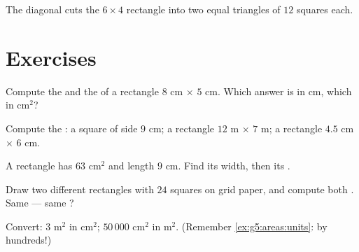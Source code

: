 \begin{omfigure}

{\small The diagonal cuts the $6 \times 4$ rectangle into two equal
triangles of $12$ squares each.}
\end{omfigure}

\section{Exercises}

\begin{exercise}[$\star$]\label{exo:g5:areas:1}
Compute the  and the  of a rectangle $8$ cm $\times$
$5$ cm. Which answer is in cm, which in cm$^2$?
\end{exercise}

\begin{exercise}[$\star$]\label{exo:g5:areas:2}
Compute the : a square of side $9$ cm; a rectangle
$12$ m $\times$ $7$ m; a rectangle $4.5$ cm $\times$ $6$ cm.
\end{exercise}

\begin{exercise}[$\star$]\label{exo:g5:areas:3}
A rectangle has  $63$ cm$^2$ and length $9$ cm. Find its width,
then its .
\end{exercise}

\begin{exercise}[$\star$]\label{exo:g5:areas:4}
Draw two different rectangles with  $24$ squares on grid paper,
and compute both . Same  --- same ?
\end{exercise}

\begin{exercise}[$\star$]\label{exo:g5:areas:5}
Convert: $3$ m$^2$ in cm$^2$; \quad $50\,000$ cm$^2$ in m$^2$.
(Remember \cref{ex:g5:areas:units}: by hundreds!)
\end{exercise}

